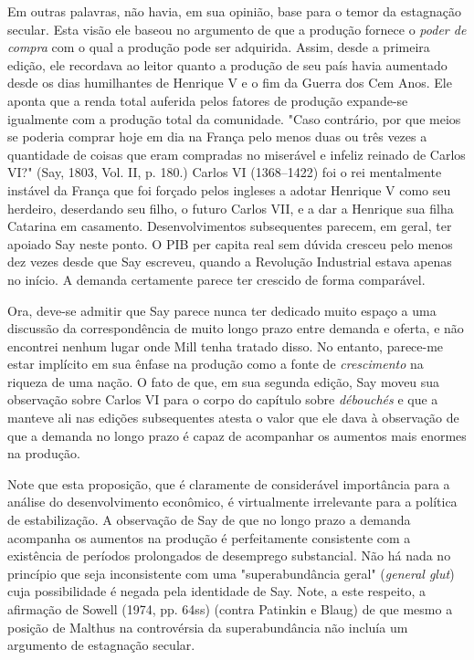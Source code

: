 \documentclass[12pt]{article}
\begin{document}
Em outras palavras, não havia, em sua opinião, base para o temor da estagnação secular. Esta visão ele baseou no argumento de que a produção fornece o \textit{poder de compra} com o qual a produção pode ser adquirida. Assim, desde a primeira edição, ele recordava ao leitor quanto a produção de seu país havia aumentado desde os dias humilhantes de Henrique V e o fim da Guerra dos Cem Anos. Ele aponta que a renda total auferida pelos fatores de produção expande-se igualmente com a produção total da comunidade. "Caso contrário, por que meios se poderia comprar hoje em dia na França pelo menos duas ou três vezes a quantidade de coisas que eram compradas no miserável e infeliz reinado de Carlos VI?" (Say, 1803, Vol. II, p. 180.) Carlos VI (1368–1422) foi o rei mentalmente instável da França que foi forçado pelos ingleses a adotar Henrique V como seu herdeiro, deserdando seu filho, o futuro Carlos VII, e a dar a Henrique sua filha Catarina em casamento. Desenvolvimentos subsequentes parecem, em geral, ter apoiado Say neste ponto. O PIB per capita real sem dúvida cresceu pelo menos dez vezes desde que Say escreveu, quando a Revolução Industrial estava apenas no início. A demanda certamente parece ter crescido de forma comparável.

Ora, deve-se admitir que Say parece nunca ter dedicado muito espaço a uma discussão da correspondência de muito longo prazo entre demanda e oferta, e não encontrei nenhum lugar onde Mill tenha tratado disso. No entanto, parece-me estar implícito em sua ênfase na produção como a fonte de \textit{crescimento} na riqueza de uma nação. O fato de que, em sua segunda edição, Say moveu sua observação sobre Carlos VI para o corpo do capítulo sobre \textit{débouchés} e que a manteve ali nas edições subsequentes atesta o valor que ele dava à observação de que a demanda no longo prazo é capaz de acompanhar os aumentos mais enormes na produção.

Note que esta proposição, que é claramente de considerável importância para a análise do desenvolvimento econômico, é virtualmente irrelevante para a política de estabilização. A observação de Say de que no longo prazo a demanda acompanha os aumentos na produção é perfeitamente consistente com a existência de períodos prolongados de desemprego substancial. Não há nada no princípio que seja inconsistente com uma "superabundância geral" (\textit{general glut}) cuja possibilidade é negada pela identidade de Say. Note, a este respeito, a afirmação de Sowell (1974, pp. 64ss) (contra Patinkin e Blaug) de que mesmo a posição de Malthus na controvérsia da superabundância não incluía um argumento de estagnação secular.
\end{document}
